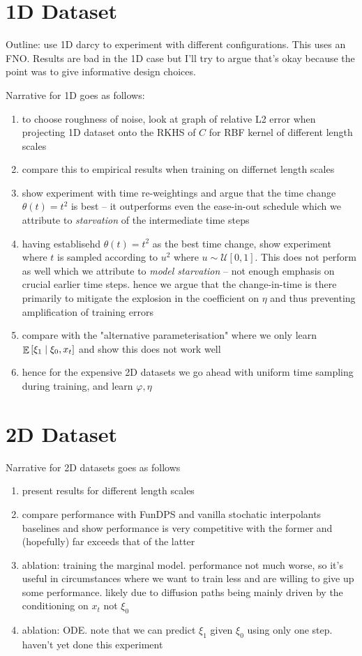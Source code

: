 \section{1D Dataset} \label{sec:prelim}
Outline: use 1D darcy to experiment with different configurations. This uses an FNO. Results are bad in the 1D case but I'll try to argue that's okay because the point was to give informative design choices.

Narrative for 1D goes as follows:
\begin{enumerate}
  \item to choose roughness of noise, look at graph of relative L2 error when projecting 1D dataset onto the RKHS of \(C\) for RBF kernel of different length scales
  \item compare this to empirical results when training on differnet length scales
  \item show experiment with time re-weightings and argue that the time change \(\theta(t) = t^{2}\) is best -- it outperforms even the ease-in-out schedule which we attribute to \textit{starvation} of the intermediate time steps
  \item having establisehd \(\theta(t) = t^{2}\) as the best time change, show experiment where \(t\) is sampled according to \(u^{2}\) where \(u \sim \mathcal{U}[0, 1]\). This does not perform as well which we attribute to \textit{model starvation} -- not enough emphasis on crucial earlier time steps. hence we argue that the change-in-time is there primarily to mitigate the explosion in the coefficient on \(\eta\) and thus preventing amplification of training errors
  \item compare with the "alternative parameterisation" where we only learn \(\mathop{\mathbb{E}}\qty[\xi_{1} \mid \xi_{0}, x_{t}]\) and show this does not work well
  \item hence for the expensive 2D datasets we go ahead with uniform time sampling during training, and learn \(\varphi, \eta\)
\end{enumerate}
\section{2D Dataset}\label{sec:darcy2}

Narrative for 2D datasets goes as follows
\begin{enumerate}
  \item present results for different length scales
  \item compare performance with FunDPS and vanilla stochatic interpolants baselines and show performance is very competitive with the former and (hopefully) far exceeds that of the latter
  \item ablation: training the marginal model. performance not much worse, so it's useful in circumstances where we want to train less and are willing to give up some performance. likely due to diffusion paths being mainly driven by the conditioning on \(x_{t}\) not \(\xi_{0}\)
  \item ablation: ODE. note that we can predict \(\xi_{1}\) given \(\xi_{0}\) using only one step. haven't yet done this experiment
\end{enumerate}